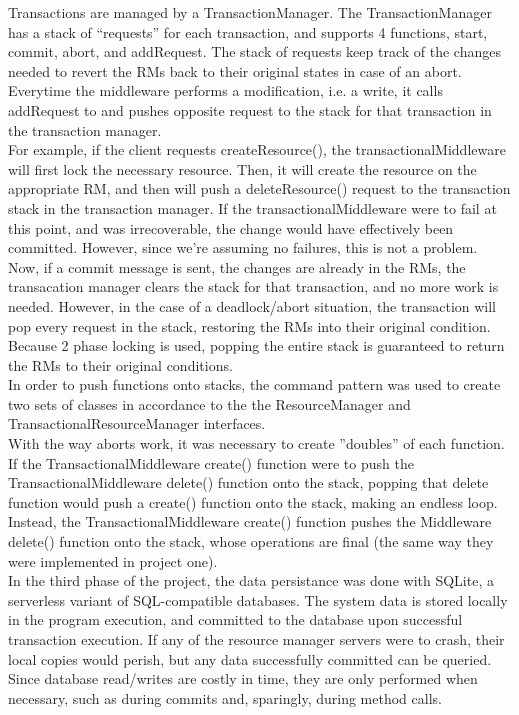 \documentclass[letterpaper,12pt]{article}
\begin{document}
	Transactions are managed by a TransactionManager. The TransactionManager has a stack of ``requests'' for each transaction, and supports 4 functions, start, commit, abort, and addRequest. The stack of requests keep track of the changes needed to revert the RMs back to their original states in case of an abort. Everytime the middleware performs a modification, i.e. a write, it calls addRequest to and pushes opposite request to the stack for that transaction in the transaction manager. \\
	
	For example, if the client requests createResource(), the transactionalMiddleware will first lock the necessary resource. Then, it will create the resource on the appropriate RM, and then will push a deleteResource() request to the transaction stack in the transaction manager. If the transactionalMiddleware were to fail at this point, and was irrecoverable, the change would have effectively been committed. However, since we're assuming no failures, this is not a problem. Now, if a commit message is sent, the changes are already in the RMs, the transacation manager clears the stack for that transaction, and no more work is needed. However, in the case of a deadlock/abort situation, the transaction will pop every request in the stack, restoring the RMs into their original condition. Because 2 phase locking is used, popping the entire stack is guaranteed to return the RMs to their original conditions.\\
	
	In order to push functions onto stacks, the command pattern was used to create two sets of classes in accordance to the the ResourceManager and TransactionalResourceManager interfaces.\\
	
	With the way aborts work, it was necessary to create ''doubles'' of each function. If the TransactionalMiddleware create() function were to push the TransactionalMiddleware delete() function onto the stack, popping that delete function would push a create() function onto the stack, making an endless loop. Instead, the TransactionalMiddleware create() function pushes the Middleware delete() function onto the stack, whose operations are final (the same way they were implemented in project one).\\
	
	In the third phase of the project, the data persistance was done with SQLite, a serverless variant of SQL-compatible databases. The system data is stored locally in the program execution, and committed to the database upon successful transaction execution. If any of the resource manager servers were to crash, their local copies would perish, but any data successfully committed can be queried. Since database read/writes are costly in time, they are only performed when necessary, such as during commits and, sparingly, during method calls.
	
\end{document}
